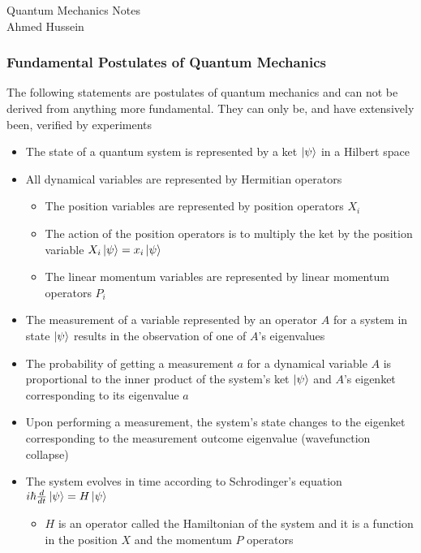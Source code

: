 \documentclass[8pt,t,mathserif,aspectratio=169]{beamer}
\newenvironment{nofootline}
{
    \setbeamertemplate{footline}{}
    \addtobeamertemplate{frametitle}{\vspace*{-0.9\baselineskip}}{}
}{}
\begin{document}
\begin{nofootline}
\begin{frame}
  \vspace{18mm}
  \begin{center}
  \Huge
  \textcolor{jhutext1}{Quantum Mechanics Notes} \\
  \LARGE
  \vspace{2mm}
  Ahmed Hussein \\
  \vspace{7mm}
  \end{center}
\end{frame}
\end{nofootline}

\begin{frame}
  \frametitle{Fundamental Postulates of Quantum Mechanics}
  \vspace{1mm}
  The following statements are postulates of quantum mechanics and can not be derived from anything more fundamental. They can only be, and have extensively been, verified by experiments
  \begin{itemize}
    \item The state of a quantum system is represented by a ket $\ket{\psi}$ in a Hilbert space
    \item All dynamical variables are represented by Hermitian operators
    \begin{itemize}
      \item The position variables are represented by position operators $X_i$
      \item The action of the position operators is to multiply the ket by the position variable $X_i\ket{\psi} = x_i\ket{\psi}$
      \item The linear momentum variables are represented by linear momentum operators $P_i$
    \end{itemize}
    \item The measurement of a variable represented by an operator $A$ for a system in state $\ket{\psi}$ results in the observation of one of $A$'s eigenvalues
    \item The probability of getting a measurement $a$ for a dynamical variable $A$ is proportional to the inner product of the system's ket $\ket{\psi}$ and $A$'s eigenket corresponding to its eigenvalue $a$
    \item Upon performing a measurement, the system's state changes to the eigenket corresponding to the measurement outcome eigenvalue (wavefunction collapse)
    \item The system evolves in time according to Schrodinger's equation $i \hbar {d \over dt} \ket{\psi} = H \ket{\psi}$
    \begin{itemize}
      \item $H$ is an operator called the Hamiltonian of the system and it is a function in the position $X$ and the momentum $P$ operators
    \end{itemize}
  \end{itemize}
\end{frame}
\end{document}
